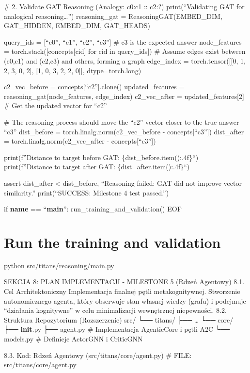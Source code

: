 \documentclass[letterpaper,twocolumn]{article}
\begin{document}
\# 2. Validate GAT Reasoning (Analogy: c0:c1 :: c2:?) print(``Validating
GAT for analogical reasoning\ldots{}'') reasoning\_gat =
ReasoningGAT(EMBED\_DIM, GAT\_HIDDEN, EMBED\_DIM, GAT\_HEADS)

query\_ids = {[}``c0'', ``c1'', ``c2'', ``c3''{]} \# c3 is the expected
answer node\_features = torch.stack({[}concepts{[}cid{]} for cid in
query\_ids{]}) \# Assume edges exist between (c0,c1) and (c2,c3) and
others, forming a graph edge\_index = torch.tensor({[}{[}0, 1, 2, 3, 0,
2{]}, {[}1, 0, 3, 2, 2, 0{]}{]}, dtype=torch.long)

c2\_vec\_before = concepts{[}``c2''{]}.clone() updated\_features =
reasoning\_gat(node\_features, edge\_index) c2\_vec\_after =
updated\_features{[}2{]} \# Get the updated vector for ``c2''

\# The reasoning process should move the ``c2'' vector closer to the
true answer ``c3'' dist\_before = torch.linalg.norm(c2\_vec\_before -
concepts{[}``c3''{]}) dist\_after = torch.linalg.norm(c2\_vec\_after -
concepts{[}``c3''{]})

print(f''Distance to target before GAT: \{dist\_before.item():.4f\}``)
print(f''Distance to target after GAT: \{dist\_after.item():.4f\}``)

assert dist\_after \textless{} dist\_before, ``Reasoning failed: GAT did
not improve vector similarity.'' print(``SUCCESS: Milestone 4 test
passed.'')

if \textbf{name} == ``\textbf{main}'': run\_training\_and\_validation()
EOF

\hypertarget{run-the-training-and-validation}{%
\section{Run the training and
validation}\label{run-the-training-and-validation}}

python src/titans/reasoning/main.py

SEKCJA 8: PLAN IMPLEMENTACJI - MILESTONE 5 (Rdzeń Agentowy) 8.1. Cel
Architektoniczny Implementacja finalnej pętli metakognitywnej.
Stworzenie autonomicznego agenta, który obserwuje stan własnej wiedzy
(grafu) i podejmuje ``działania kognitywne'' w celu minimalizacji
wewnętrznej niepewności. 8.2. Struktura Repozytorium (Rozszerzenie) src/
└── titans/ ├── \ldots{} └── core/ ├── \textbf{init}.py ├── agent.py \#
Implementacja AgenticCore i pętli A2C └── models.py \# Definicje
ActorGNN i CriticGNN

8.3. Kod: Rdzeń Agentowy (src/titans/core/agent.py) \# FILE:
src/titans/core/agent.py
\end{document}
